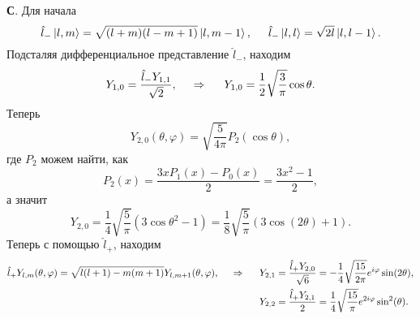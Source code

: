 \textbf{С}.
Для начала 
\begin{equation*}
    \hat{l}_- \left| l, m \right\rangle = \sqrt{(l+m)(l-m+1)} \left| l,m-1 \right\rangle,
    \hspace{5 mm} 
    \hat{l}_- \left| l, l \right\rangle = \sqrt{2l} \left| l, l-1 \right\rangle.
\end{equation*}
Подсталяя дифференциальное представление $\hat{l}_-$, находим
\begin{equation*}
    Y_{1,0} = \frac{\hat{l}_- Y_{1, 1}}{\sqrt{2}},
    \hspace{0.5cm} \Rightarrow \hspace{0.5cm}
    Y_{1, 0} = \frac{1}{2} \sqrt{\frac{3}{\pi}} \cos \theta.
\end{equation*}
Теперь
\begin{equation*}
    Y_{2,0} (\theta, \varphi) = \sqrt{\frac{5}{4 \pi}} P_2 (\cos \theta),
\end{equation*}
где $P_2$ можем найти, как
\begin{equation*}
    P_2 (x) = \frac{3 x P_1 (x) - P_0(x)}{2} = \frac{3 x^2 -1}{2},
\end{equation*}
а значит
\begin{equation*}
    Y_{2, 0} = 
    \frac{1}{4} \sqrt{\frac{5}{\pi}} (3 \cos \theta^2 -1) 
    = \frac{1}{8} \sqrt{\frac{5}{\pi}} \left(3 \cos (2 \theta) + 1\right).
\end{equation*}
Теперь с помощью $\hat{l}_+$, находим
\begin{align*}
    \hat{l}_+ Y_{l,m} (\theta, \varphi) = \sqrt{l (l+1) - m (m+1)} Y_{l, m+1} (\theta, \varphi),
    \hspace{0.5cm} \Rightarrow \hspace{0.5cm}
    Y_{2, 1} &= \frac{\hat{l}_+ Y_{2,0}}{\sqrt{6}} = - \frac{1}{4} \sqrt{\frac{15}{2 \pi}} e^{i \varphi} \sin(2 \theta), \\
    Y_{2, 2} &= \frac{\hat{l}_+ Y_{2,1}}{2} =  \frac{1}{4} \sqrt{\frac{15}{\pi}} e^{2 i \varphi} \sin^2 (\theta).
\end{align*}


